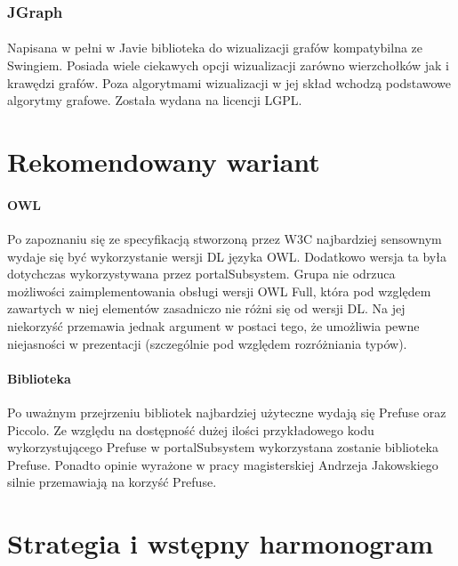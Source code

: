 \documentclass[a4paper,10pt]{article}
\begin{document}
\subsubsection{JGraph}
\paragraph{} Napisana w pełni w Javie biblioteka do wizualizacji grafów kompatybilna ze Swingiem. Posiada wiele ciekawych opcji wizualizacji zarówno wierzchołków jak i krawędzi grafów. Poza algorytmami wizualizacji w jej skład wchodzą podstawowe algorytmy grafowe. Została wydana na licencji LGPL.


\section{Rekomendowany wariant}


\paragraph{OWL} Po zapoznaniu się ze specyfikacją stworzoną przez W3C najbardziej sensownym wydaje się być wykorzystanie wersji DL języka OWL. Dodatkowo wersja ta była dotychczas wykorzystywana przez portalSubsystem. Grupa nie odrzuca możliwości zaimplementowania obsługi wersji OWL Full, która pod względem zawartych w niej elementów zasadniczo nie różni się od wersji DL. Na jej niekorzyść przemawia jednak argument w postaci tego, że umożliwia pewne niejasności w prezentacji (szczególnie pod względem rozróżniania typów).

\paragraph{Biblioteka }Po uważnym przejrzeniu bibliotek najbardziej użyteczne wydają się Prefuse oraz Piccolo. Ze względu na dostępność dużej ilości przykładowego kodu wykorzystującego Prefuse w portalSubsystem wykorzystana zostanie biblioteka Prefuse. Ponadto opinie wyrażone w pracy magisterskiej Andrzeja Jakowskiego silnie przemawiają na korzyść Prefuse.


\section{Strategia i wstępny harmonogram}
\end{document}

